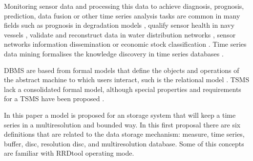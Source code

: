 Monitoring sensor data and processing this data to achieve diagnosis,
prognosis, prediction, data fusion or other time series analysis tasks are common in many fields such as prognosis in degradation models \parencite{yu11}, qualify sensor health in navy vessels \parencite{palmer07}, validate and reconstruct data in water distribution networks \parencite{quevedo10}, sensor networks information dissemination \parencite{deligiannakis07} or economic stock classification \parencite{dreyer95}. Time series data mining formalises the knowledge discovery in time series databases \parencite{last01}. 


DBMS are based from formal models that define the objects and
operations of the abstract machine to which users interact, such is
the relational model \parencite{date}. TSMS lack a consolidated formal
model, although special properties and requirements for a TSMS
have been proposed \parencite{dreyer94}.

In this paper
a model is proposed for an storage system that will keep a time series
in a multiresolution and bounded way.  In this first proposal there
are six definitions that are related to the data storage mechanism:
measure, time series, buffer, disc, resolution disc, and multiresolution
database. Some of this concepts are familiar with RRDtool
operating mode.




